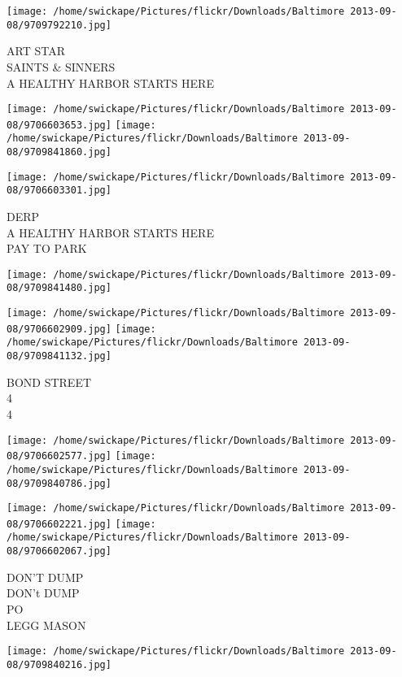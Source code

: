 \documentclass[10pt,letterpaper]{article}
\begin{document}
\vspace{0.25in}
\texttt{[image: /home/swickape/Pictures/flickr/Downloads/Baltimore 2013-09-08/9709792210.jpg]}

ART STAR\\
SAINTS \& SINNERS\\
A HEALTHY HARBOR STARTS HERE\\
\pagebreak

\texttt{[image: /home/swickape/Pictures/flickr/Downloads/Baltimore 2013-09-08/9706603653.jpg]}
\texttt{[image: /home/swickape/Pictures/flickr/Downloads/Baltimore 2013-09-08/9709841860.jpg]}

\texttt{[image: /home/swickape/Pictures/flickr/Downloads/Baltimore 2013-09-08/9706603301.jpg]}

DERP\\
A HEALTHY HARBOR STARTS HERE\\
PAY TO PARK\\
\pagebreak

\texttt{[image: /home/swickape/Pictures/flickr/Downloads/Baltimore 2013-09-08/9709841480.jpg]}

\vspace{0.25in}
\texttt{[image: /home/swickape/Pictures/flickr/Downloads/Baltimore 2013-09-08/9706602909.jpg]}
\texttt{[image: /home/swickape/Pictures/flickr/Downloads/Baltimore 2013-09-08/9709841132.jpg]}

BOND STREET\\
4\\
4\\
\pagebreak

\texttt{[image: /home/swickape/Pictures/flickr/Downloads/Baltimore 2013-09-08/9706602577.jpg]}
\texttt{[image: /home/swickape/Pictures/flickr/Downloads/Baltimore 2013-09-08/9709840786.jpg]}

\texttt{[image: /home/swickape/Pictures/flickr/Downloads/Baltimore 2013-09-08/9706602221.jpg]}
\texttt{[image: /home/swickape/Pictures/flickr/Downloads/Baltimore 2013-09-08/9706602067.jpg]}

DON'T DUMP\\
DON't DUMP\\
PO\\
LEGG MASON\\
\pagebreak

\texttt{[image: /home/swickape/Pictures/flickr/Downloads/Baltimore 2013-09-08/9709840216.jpg]}
\end{document}
